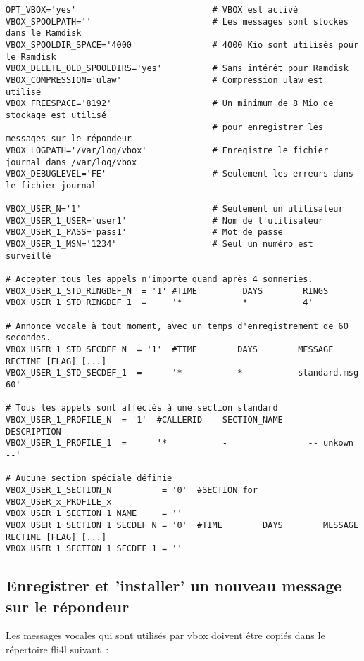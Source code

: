 \begin{verbatim}
OPT_VBOX='yes'                           # VBOX est activé
VBOX_SPOOLPATH=''                        # Les messages sont stockés dans le Ramdisk
VBOX_SPOOLDIR_SPACE='4000'               # 4000 Kio sont utilisés pour le Ramdisk
VBOX_DELETE_OLD_SPOOLDIRS='yes'          # Sans intérêt pour Ramdisk
VBOX_COMPRESSION='ulaw'                  # Compression ulaw est utilisé
VBOX_FREESPACE='8192'                    # Un minimum de 8 Mio de stockage est utilisé
                                         # pour enregistrer les messages sur le répondeur
VBOX_LOGPATH='/var/log/vbox'             # Enregistre le fichier journal dans /var/log/vbox
VBOX_DEBUGLEVEL='FE'                     # Seulement les erreurs dans le fichier journal 

VBOX_USER_N='1'                          # Seulement un utilisateur
VBOX_USER_1_USER='user1'                 # Nom de l'utilisateur
VBOX_USER_1_PASS='pass1'                 # Mot de passe
VBOX_USER_1_MSN='1234'                   # Seul un numéro est surveillé

# Accepter tous les appels n'importe quand après 4 sonneries.
VBOX_USER_1_STD_RINGDEF_N  = '1' #TIME         DAYS        RINGS
VBOX_USER_1_STD_RINGDEF_1  =     '*            *           4'

# Annonce vocale à tout moment, avec un temps d'enregistrement de 60 secondes.
VBOX_USER_1_STD_SECDEF_N  = '1'  #TIME        DAYS        MESSAGE             RECTIME [FLAG] [...]
VBOX_USER_1_STD_SECDEF_1  =      '*           *           standard.msg        60'

# Tous les appels sont affectés à une section standard
VBOX_USER_1_PROFILE_N  = '1'  #CALLERID    SECTION_NAME     DESCRIPTION
VBOX_USER_1_PROFILE_1  =      '*           -                -- unkown --'

# Aucune section spéciale définie
VBOX_USER_1_SECTION_N          = '0'  #SECTION for VBOX_USER_x_PROFILE_x
VBOX_USER_1_SECTION_1_NAME     = ''
VBOX_USER_1_SECTION_1_SECDEF_N = '0'  #TIME        DAYS        MESSAGE             RECTIME [FLAG] [...]
VBOX_USER_1_SECTION_1_SECDEF_1 = ''

\end{verbatim}

\subsection{Enregistrer et 'installer' un nouveau message sur le répondeur}

Les messages vocales qui sont utilisés par vbox doivent être copiés dans le répertoire fli4l suivant~:

